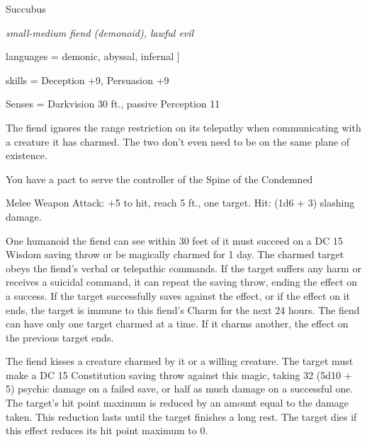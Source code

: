 \begin{monsterbox}{Succubus}
	\begin{hangingpar}
		\textit{small-medium fiend (demonoid), lawful evil}
	\end{hangingpar}
	\dndline%
	\basics[armorclass = summoners AC, hitpoints = 20 + 2 $\times$ player level, speed = 30 ft]
	\dndline%
	\stats[STR = \stat{8}, DEX = \stat{17}, CON = \stat{13}, INT = \stat{15}, WIS = \stat{12},	CHA = \stat{20}]
	\dndline
	languages = {demonic, abyssal, infernal}
	]
	
	\dndline%
	skills = Deception +9, Persuasion +9
	
	Senses = Darkvision 30 ft., passive Perception 11
	
	\dndline%
	\begin{monsteraction}
		The fiend ignores the range restriction on its telepathy when communicating with a creature it has charmed. The two don't even need to be on the same plane of existence.
	\end{monsteraction}	
	\begin{monsteraction}
		You have a pact to serve the controller of the Spine of the Condemned
	\end{monsteraction}	
	\begin{monsteraction}
		Melee Weapon Attack: +5 to hit, reach 5 ft., one target. Hit: (1d6 + 3) slashing damage. 
	\end{monsteraction}	
	\begin{monsteraction}[Charm]
		 One humanoid the fiend can see within 30 feet of it must succeed on a DC 15 Wisdom saving throw or be magically charmed for 1 day. The charmed target obeys the fiend's verbal or telepathic commands. If the target suffers any harm or receives a suicidal command, it can repeat the saving throw, ending the effect on a success. If the target successfully saves against the effect, or if the effect on it ends, the target is immune to this fiend's Charm for the next 24 hours. The fiend can have only one target charmed at a time. If it charms another, the effect on the previous target ends.
	\end{monsteraction}	
	\begin{monsteraction}
 		The fiend kisses a creature charmed by it or a willing creature. The target must make a DC 15 Constitution saving throw against this magic, taking 32 (5d10 + 5) psychic damage on a failed save, or half as much damage on a successful one. The target's hit point maximum is reduced by an amount equal to the damage taken. This reduction lasts until the target finishes a long rest. The target dies if this effect reduces its hit point maximum to 0.
	\end{monsteraction}	
\end{monsterbox}

